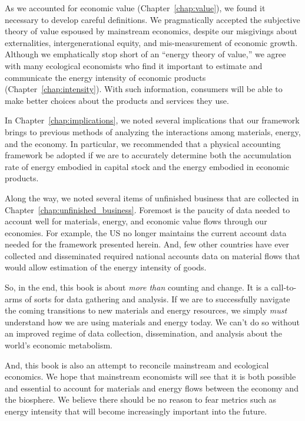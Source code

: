 As we accounted for economic value 
(Chapter~\ref{chap:value}),
we found it necessary to develop careful definitions.
We pragmatically accepted the subjective theory of value espoused 
by mainstream economics, despite our misgivings 
about externalities, intergenerational equity, 
and mis-measurement of economic growth.
Although we emphatically stop short of an ``energy theory of value,'' %
we agree with many ecological economists
who find it important to estimate and communicate 
the energy intensity of economic products (Chapter~\ref{chap:intensity}).
With such information, consumers will be able to make
better choices about the products and services they use.

In Chapter~\ref{chap:implications}, we noted several implications
that our framework brings to previous methods of analyzing 
the interactions among materials, energy, and the economy.
In particular, we recommended that a physical accounting framework
be adopted if we are to accurately determine
both the accumulation rate of energy embodied 
in capital stock
and the energy embodied in economic products.

Along the way, we noted several items of unfinished business
that are collected in Chapter~\ref{chap:unfinished_business}.
Foremost is the paucity of data
needed to account well for materials, energy, and economic
value flows through our economies.
For example, the US no longer maintains the current account data
needed for the framework presented herein.
And, few other countries have ever collected and disseminated
required national accounts data on material flows that would allow
estimation of the energy intensity of goods.

\vspace{10 mm}

So, in the end, this book is about \emph{more than} counting and change.
It is a call-to-arms of sorts for data gathering and analysis.
If we are to successfully navigate the coming transitions
to new materials and energy resources, we simply \emph{must}
understand how we are using 
materials and energy today.
We can't do so without an improved regime 
of data collection, dissemination, and analysis
about the world's economic metabolism.

And, this book is also an attempt to reconcile 
mainstream and ecological economics. 
We hope that mainstream economists will see that it is 
both possible and essential to account for materials and energy flows
between the economy and the biosphere.
We believe there should be no reason to fear metrics such as energy intensity
that will become increasingly important into the future.

